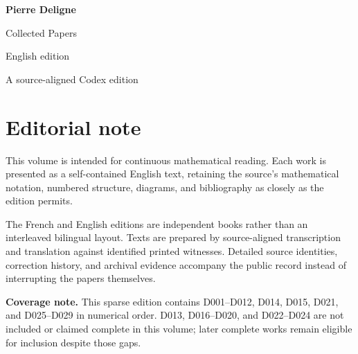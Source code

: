 \documentclass[11pt,a4paper]{article}
\begin{document}
\begin{titlepage}
  \pagecolor{DeligneBlue}
  \color{white}
  \vspace*{34mm}
  {\fontsize{30}{36}\selectfont\bfseries Pierre Deligne\par}
  \vspace{7mm}
  {\fontsize{18}{23}\selectfont Collected Papers\par}
  \vspace{4mm}
  {\large English edition\par}
  \vfill
  {\normalsize A source-aligned Codex edition\par}
\end{titlepage}
\setcounter{page}{2}
\nopagecolor
\color{DeligneInk}
\section*{Editorial note}
This volume is intended for continuous mathematical reading. Each work is presented as a self-contained English text, retaining the source's mathematical notation, numbered structure, diagrams, and bibliography as closely as the edition permits.

The French and English editions are independent books rather than an interleaved bilingual layout. Texts are prepared by source-aligned transcription and translation against identified printed witnesses. Detailed source identities, correction history, and archival evidence accompany the public record instead of interrupting the papers themselves.

\textbf{Coverage note.} This sparse edition contains D001--D012, D014, D015, D021, and D025--D029 in numerical order. D013, D016--D020, and D022--D024 are not included or claimed complete in this volume; later complete works remain eligible for inclusion despite those gaps.
\end{document}
